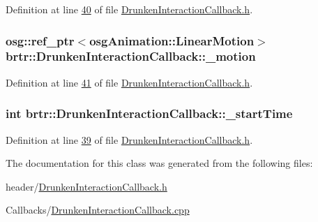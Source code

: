 Definition at line \hyperlink{_drunken_interaction_callback_8h_source_l00040}{40} of file \hyperlink{_drunken_interaction_callback_8h_source}{Drunken\+Interaction\+Callback.\+h}.

\hypertarget{classbrtr_1_1_drunken_interaction_callback_adaa3e659a9f6516a5b59a43813506a11}{
\subsubsection[{\+\_\+motion}]{\setlength{\rightskip}{0pt plus 5cm}osg\+::ref\+\_\+ptr$<$osg\+Animation\+::\+Linear\+Motion$>$ brtr\+::\+Drunken\+Interaction\+Callback\+::\+\_\+motion\hspace{0.3cm}{\ttfamily [private]}}}\label{classbrtr_1_1_drunken_interaction_callback_adaa3e659a9f6516a5b59a43813506a11}


Definition at line \hyperlink{_drunken_interaction_callback_8h_source_l00041}{41} of file \hyperlink{_drunken_interaction_callback_8h_source}{Drunken\+Interaction\+Callback.\+h}.

\hypertarget{classbrtr_1_1_drunken_interaction_callback_ab1a42a563e42cfd1d480741b30e22245}{
\subsubsection[{\+\_\+start\+Time}]{\setlength{\rightskip}{0pt plus 5cm}int brtr\+::\+Drunken\+Interaction\+Callback\+::\+\_\+start\+Time\hspace{0.3cm}{\ttfamily [private]}}}\label{classbrtr_1_1_drunken_interaction_callback_ab1a42a563e42cfd1d480741b30e22245}


Definition at line \hyperlink{_drunken_interaction_callback_8h_source_l00039}{39} of file \hyperlink{_drunken_interaction_callback_8h_source}{Drunken\+Interaction\+Callback.\+h}.



The documentation for this class was generated from the following files\+:\begin{DoxyCompactItemize}
\item 
header/\hyperlink{_drunken_interaction_callback_8h}{Drunken\+Interaction\+Callback.\+h}\item 
Callbacks/\hyperlink{_drunken_interaction_callback_8cpp}{Drunken\+Interaction\+Callback.\+cpp}\end{DoxyCompactItemize}
